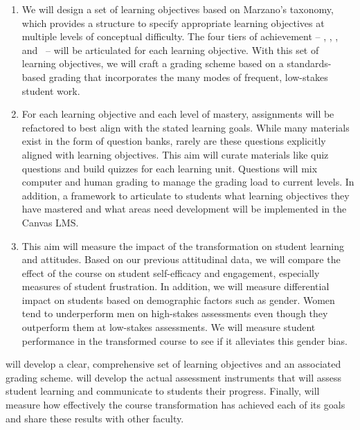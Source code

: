 \documentclass[10pt,letterpaper]{article}
\begin{document}
\begin{enumerate}[nosep,label=\textbf{\arabic*}.]
\item {} 
We will design a set of learning objectives  based on Marzano's taxonomy, which provides a structure to specify appropriate learning objectives at multiple levels of conceptual difficulty. The four tiers of achievement -- \recall, \comprehension, \analysis, and \use\ -- will be articulated for each learning objective. With this set of learning objectives, we will craft a grading scheme based on a standards-based grading that incorporates the many modes of frequent, low-stakes student work.%

\item {}
For each learning objective and each level of mastery, assignments will be refactored to best align with the stated learning goals. While many materials exist in the form of question banks, rarely are these questions explicitly aligned with learning objectives. This aim will curate materials like quiz questions and build quizzes for each learning unit. Questions will mix computer and human grading to manage the grading load to current levels. In addition,  a framework to articulate to students what learning objectives they have mastered and what areas need development will be implemented in the Canvas LMS.

\item {}
This aim will measure the impact of the transformation on student learning and attitudes. Based on our previous attitudinal data, we will compare the effect of the course on student self-efficacy and engagement, especially measures of student frustration. In addition, we will measure differential impact on students based on demographic factors such as gender. Women tend to underperform men on high-stakes assessments even though they outperform them at low-stakes assessments. We will measure student performance in the transformed course to see if it alleviates this gender bias.
\end{enumerate}
 will develop a clear, comprehensive set of learning objectives and an associated grading scheme. 
 will develop the actual assessment instruments that will assess student learning and communicate to students their progress. Finally,  will measure how effectively the course transformation has achieved each of its goals and share these results with other faculty.
\end{document}
